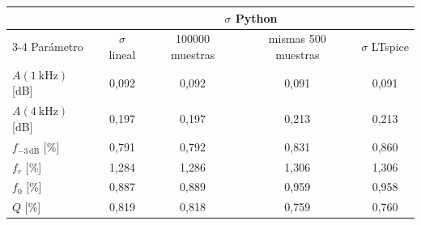 \begin{tabular}{@{}lcccc@{}}
\toprule
& & \multicolumn{2}{c}{$\sigma$ Python} & \\ \cmidrule(lr){3-4} Parámetro & $\sigma$ lineal & \num{100000} muestras & mismas \num{500} muestras & $\sigma$ LTspice \\
\midrule
$A(\qty{1}{\kilo\hertz})$ [dB] & 0{,}092 & 0{,}092 & 0{,}091 & 0{,}091 \\
$A(\qty{4}{\kilo\hertz})$ [dB] & 0{,}197 & 0{,}197 & 0{,}213 & 0{,}213 \\
$f_{-3\,\text{dB}}$ [\%] & 0{,}791 & 0{,}792 & 0{,}831 & 0{,}860 \\
$f_r$ [\%] & 1{,}284 & 1{,}286 & 1{,}306 & 1{,}306 \\
$f_0$ [\%] & 0{,}887 & 0{,}889 & 0{,}959 & 0{,}958 \\
$Q$ [\%] & 0{,}819 & 0{,}818 & 0{,}759 & 0{,}760 \\
\bottomrule
\end{tabular}
